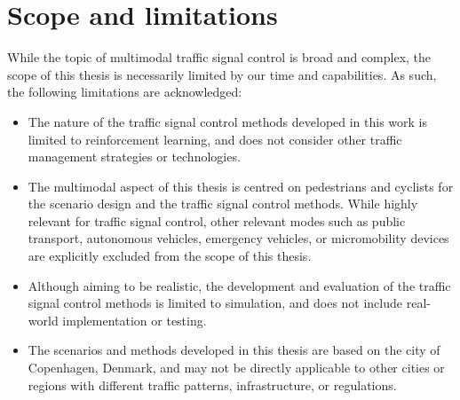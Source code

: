 \section{Scope and limitations}

While the topic of multimodal traffic signal control is broad and complex, the scope of this thesis is necessarily limited by our time and capabilities. As such, the following limitations are acknowledged:

\begin{itemize}
    \item The nature of the traffic signal control methods developed in this work is limited to reinforcement learning, and does not consider other traffic management strategies or technologies.
    \item The multimodal aspect of this thesis is centred on pedestrians and cyclists for the scenario design and the traffic signal control methods. While highly relevant for traffic signal control, other relevant modes such as public transport, autonomous vehicles, emergency vehicles, or micromobility devices are explicitly excluded from the scope of this thesis.
    \item Although aiming to be realistic, the development and evaluation of the traffic signal control methods is limited to simulation, and does not include real-world implementation or testing.
    \item The scenarios and methods developed in this thesis are based on the city of Copenhagen, Denmark, and may not be directly applicable to other cities or regions with different traffic patterns, infrastructure, or regulations.
\end{itemize}